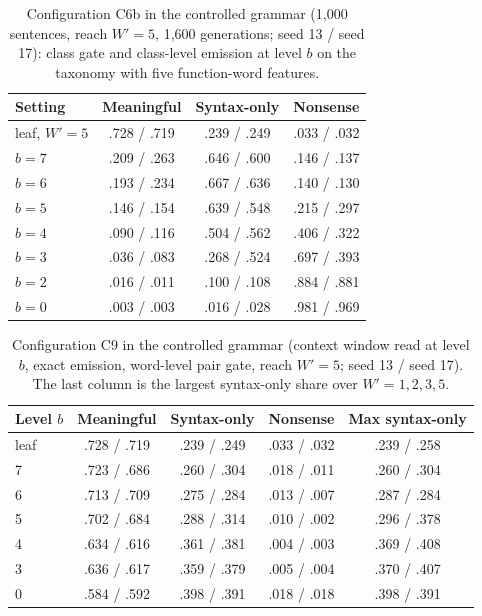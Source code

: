 \documentclass[11pt,letterpaper]{article}
\begin{document}
\begin{table}[h]
\caption{Configuration C6b in the controlled grammar (1,000 sentences, reach $W'=5$, 1,600 generations; seed 13 / seed 17): class gate and class-level emission at level $b$ on the taxonomy with five function-word features.}
\label{tab:r230dial}
\begin{center}
\small
\begin{tabular}{lccc}
\toprule
Setting & Meaningful & Syntax-only & Nonsense \\
\midrule
leaf, $W'=5$ & .728 / .719 & .239 / .249 & .033 / .032 \\
$b=7$ & .209 / .263 & .646 / .600 & .146 / .137 \\
$b=6$ & .193 / .234 & .667 / .636 & .140 / .130 \\
$b=5$ & .146 / .154 & .639 / .548 & .215 / .297 \\
$b=4$ & .090 / .116 & .504 / .562 & .406 / .322 \\
$b=3$ & .036 / .083 & .268 / .524 & .697 / .393 \\
$b=2$ & .016 / .011 & .100 / .108 & .884 / .881 \\
$b=0$ & .003 / .003 & .016 / .028 & .981 / .969 \\
\bottomrule
\end{tabular}
\end{center}
\end{table}

\begin{table}[h]
\caption{Configuration C9 in the controlled grammar (context window read at level $b$, exact emission, word-level pair gate, reach $W'=5$; seed 13 / seed 17). The last column is the largest syntax-only share over $W'=1,2,3,5$.}
\label{tab:r230c9}
\begin{center}
\small
\begin{tabular}{lcccc}
\toprule
Level $b$ & Meaningful & Syntax-only & Nonsense & Max syntax-only \\
\midrule
leaf & .728 / .719 & .239 / .249 & .033 / .032 & .239 / .258 \\
7 & .723 / .686 & .260 / .304 & .018 / .011 & .260 / .304 \\
6 & .713 / .709 & .275 / .284 & .013 / .007 & .287 / .284 \\
5 & .702 / .684 & .288 / .314 & .010 / .002 & .296 / .378 \\
4 & .634 / .616 & .361 / .381 & .004 / .003 & .369 / .408 \\
3 & .636 / .617 & .359 / .379 & .005 / .004 & .370 / .407 \\
0 & .584 / .592 & .398 / .391 & .018 / .018 & .398 / .391 \\
\bottomrule
\end{tabular}
\end{center}
\end{table}
\end{document}
